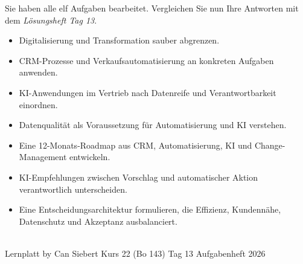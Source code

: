\documentclass[11pt,a4paper,oneside]{article}
\begin{document}
\noindent Sie haben alle elf Aufgaben bearbeitet. Vergleichen Sie nun Ihre Antworten mit dem \emph{Lösungsheft Tag 13}.

\medskip
\begin{infobox}
\begin{itemize}
  \item Digitalisierung und Transformation sauber abgrenzen.
  \item CRM-Prozesse und Verkaufsautomatisierung an konkreten Aufgaben anwenden.
  \item KI-Anwendungen im Vertrieb nach Datenreife und Verantwortbarkeit einordnen.
  \item Datenqualität als Voraussetzung für Automatisierung und KI verstehen.
  \item Eine 12-Monats-Roadmap aus CRM, Automatisierung, KI und Change-Management entwickeln.
  \item KI-Empfehlungen zwischen Vorschlag und automatischer Aktion verantwortlich unterscheiden.
  \item Eine Entscheidungsarchitektur formulieren, die Effizienz, Kundennähe, Datenschutz und Akzeptanz ausbalanciert.
\end{itemize}
\end{infobox}

\vspace{1cm}
\noindent{\color{lpAccent}\rule{\linewidth}{0.6pt}}\\[4pt]
{\footnotesize\sffamily\color{lpGray}Lernplatt \textperiodcentered{} by Can Siebert \textperiodcentered{} Kurs 22 (Bo 143) \textperiodcentered{} Tag 13 \textperiodcentered{} Aufgabenheft \textperiodcentered{} \textcopyright{} 2026}
\end{document}
